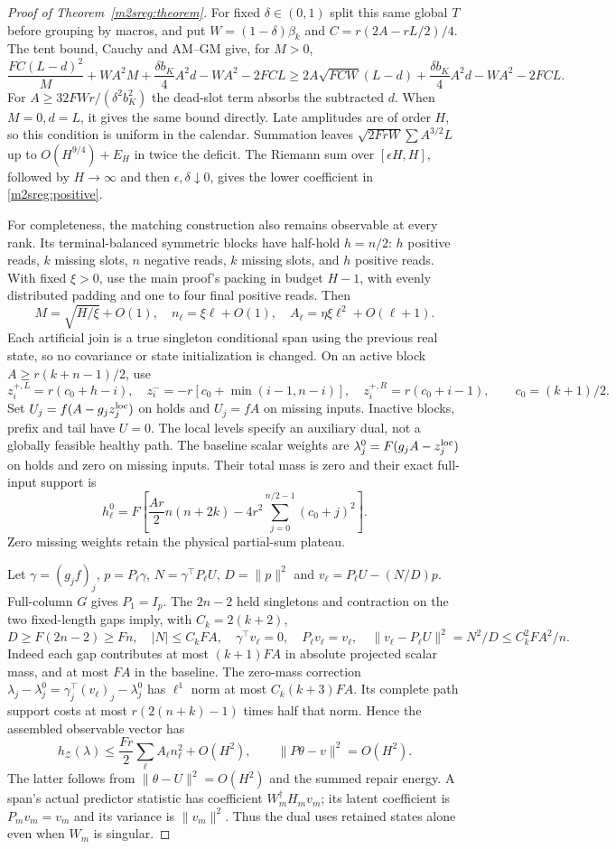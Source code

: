 \documentclass[11pt]{article}
\begin{document}
\begin{proof}[Proof of Theorem~\ref{m2sreg:theorem}]
For fixed $\delta\in(0,1)$ split this same global $T$ before grouping
by macros, and put $W=(1-\delta)\beta_k$ and
$C=r(2A-rL/2)/4$. The tent bound, Cauchy and AM--GM give, for $M>0$,
\[
\frac{FC(L-d)^2}{M}+WA^2M+
 \frac{\delta b_K}{4}A^2d-WA^2-2FCL
\ge 2A\sqrt{FCW}(L-d)+
 \frac{\delta b_K}{4}A^2d-WA^2-2FCL .
\]
For $A\ge32FWr/(\delta^2b_K^2)$ the dead-slot term absorbs
the subtracted $d$. When $M=0,d=L$, it gives the same bound directly.
Late amplitudes are of order $H$, so this condition is uniform
in the calendar. Summation leaves
$\sqrt{2FrW}\sum A^{3/2}L$ up to $O(H^{9/4})+E_H$ in twice
the deficit. The Riemann sum over $[\epsilon H,H]$, followed by
$H\to\infty$ and then $\epsilon,\delta\downarrow0$, gives
the lower coefficient in \eqref{m2sreg:positive}.

For completeness, the matching construction also remains observable
at every rank. Its terminal-balanced symmetric blocks have
half-hold $h=n/2$: $h$ positive reads, $k$ missing slots, $n$
negative reads, $k$ missing slots, and $h$ positive reads.
With fixed $\xi>0$, use the main proof's packing in budget $H-1$,
with evenly distributed padding and one to four final positive reads.
Then
\[
M=\sqrt{H/\xi}+O(1),\quad
n_\ell=\xi\ell+O(1),\quad
A_\ell=\eta\xi\ell^2+O(\ell+1).
\]
Each artificial join is a true singleton conditional span using the
previous real state, so no covariance or state initialization is changed.
On an active block $A\ge r(k+n-1)/2$, use
\[
z_i^{+,L}=r(c_0+h-i),\quad
z_i^-=-r[c_0+\min(i-1,n-i)],\quad
z_i^{+,R}=r(c_0+i-1),\qquad c_0=(k+1)/2 .
\]
Set $U_j=f(A-g_jz_j^{\rm loc})$ on holds and $U_j=fA$ on missing
inputs. Inactive blocks, prefix and tail have $U=0$.
The local levels specify an auxiliary dual, not a globally feasible
healthy path. The baseline scalar weights are
$\lambda_j^0=F(g_jA-z_j^{\rm loc})$ on holds and zero on missing inputs.
Their total mass is zero and their exact full-input support is
\[
h_\ell^0=F\left[\frac{Ar}{2}n(n+2k)
 -4r^2\sum_{j=0}^{n/2-1}(c_0+j)^2\right].
\]
Zero missing weights retain the physical partial-sum plateau.

Let $\gamma=(g_jf)_j$, $p=P_\ell\gamma$,
$N=\gamma^\top P_\ell U$, $D=\|p\|^2$ and
$v_\ell=P_\ell U-(N/D)p$.
Full-column $G$ gives $P_1=I_p$. The $2n-2$ held singletons and
contraction on the two fixed-length gaps imply, with $C_k=2(k+2)$,
\[
D\ge F(2n-2)\ge Fn,\quad |N|\le C_kFA,\quad
\gamma^\top v_\ell=0,\quad P_\ell v_\ell=v_\ell,\quad
\|v_\ell-P_\ell U\|^2=N^2/D\le C_k^2FA^2/n .
\]
Indeed each gap contributes at most $(k+1)FA$ in absolute projected
scalar mass, and at most $FA$ in the baseline.
The zero-mass correction
$\lambda_j-\lambda_j^0=\gamma_j^\top(v_\ell)_j-\lambda_j^0$
has $\ell^1$ norm at most $C_k(k+3)FA$.
Its complete path support costs at most
$r(2(n+k)-1)$ times half that norm.
Hence the assembled observable vector has
\[
h_{\mathcal Z}(\lambda)\le\frac{Fr}{2}
 \sum_\ell A_\ell n_\ell^2+O(H^2),\qquad
\|P\theta-v\|^2=O(H^2).
\]
The latter follows from $\|\theta-U\|^2=O(H^2)$ and the summed
repair energy. A span's actual predictor statistic has coefficient
$W_m^\dagger H_mv_m$; its latent coefficient is $P_mv_m=v_m$
and its variance is $\|v_m\|^2$.
Thus the dual uses retained states alone even when $W_m$ is singular.


\end{proof}
\end{document}
